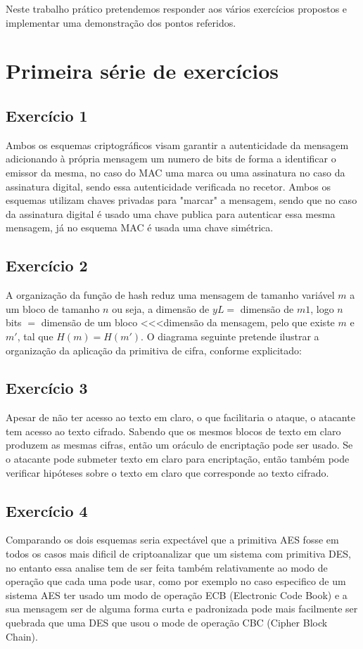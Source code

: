 \documentclass[11pt]{report}
\begin{document}
Neste trabalho prático pretendemos responder aos vários exercícios propostos e implementar uma demonstração dos pontos referidos.

\newpage

\section{Primeira série de exercícios}
\subsection{Exercício 1}

Ambos os esquemas criptográficos visam garantir a autenticidade da mensagem adicionando à própria mensagem um numero de bits de forma a identificar o emissor da mesma, no caso do MAC uma marca ou uma assinatura no caso da assinatura digital, sendo essa autenticidade verificada no recetor. Ambos os esquemas utilizam chaves privadas para "marcar" \space a mensagem, sendo que no caso da assinatura digital é usado uma chave publica para autenticar essa mesma mensagem, já no esquema MAC é usada uma chave simétrica.\\

\subsection{Exercício 2}
A organização da função de hash reduz uma mensagem de tamanho variável $ m $ a um bloco de tamanho $ n $ ou seja, a dimensão de $ yL = $ dimensão de $ m1 $, logo $ n $ bits $ = $ dimensão de um bloco <<<\space dimensão da mensagem, pelo que existe $ m $ e $ m' $, tal que $ H(m) = H(m')$. O diagrama seguinte pretende ilustrar a organização da aplicação da primitiva de cifra, conforme explicitado:\\

\subsection{Exercício 3}
Apesar de não ter acesso ao texto em claro, o que facilitaria o ataque, o atacante tem acesso ao texto cifrado. Sabendo que os mesmos blocos de texto em claro produzem as mesmas cifras, então um oráculo de encriptação pode ser usado. Se o atacante pode submeter texto em claro para encriptação, então também pode verificar hipóteses sobre o texto em claro que corresponde ao texto cifrado.\\

\subsection{Exercício 4}
Comparando os dois esquemas seria expectável que a primitiva AES fosse em todos os casos mais dificil de criptoanalizar que um sistema com primitiva DES, no entanto essa analise tem de ser feita também relativamente ao modo de operação que cada uma pode usar, como por exemplo no caso especifico de um sistema AES ter usado um modo de operação ECB (Electronic Code Book) e a sua mensagem ser de alguma forma curta e padronizada pode mais facilmente ser quebrada que uma DES que usou o mode de operação CBC (Cipher Block Chain).\\
\end{document}
